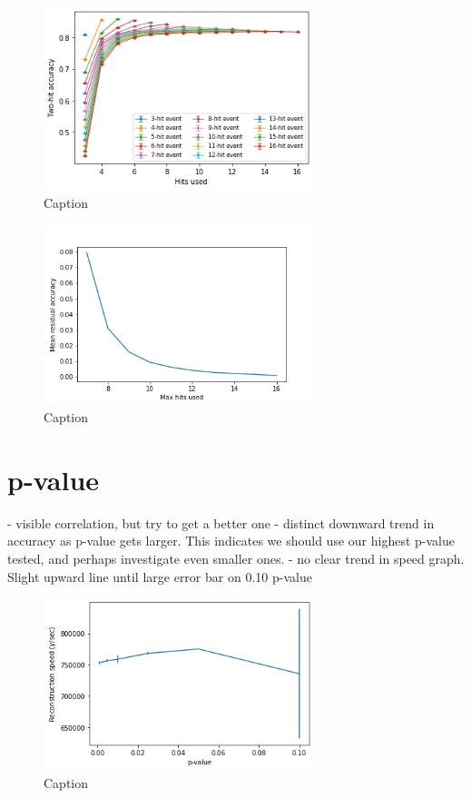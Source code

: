 \begin{figure}
    \centering
    \includegraphics[width=0.7\textwidth]{graphs/pi_hits_v_hitsUsed_accuracy.png}
    \caption{Caption}
    \label{fig:my_label}
\end{figure}

\begin{figure}
    \centering
    \includegraphics[width=0.7\textwidth]{graphs/mean_resid_acc.png}
    \caption{Caption}
    \label{fig:my_label}
\end{figure}

\section{p-value}
- visible correlation, but try to get a better one
- distinct downward trend in accuracy as p-value gets larger. This indicates we should use our highest p-value tested, and perhaps investigate even smaller ones.
- no clear trend in speed graph. Slight upward line until large error bar on 0.10 p-value

\begin{figure}
    \centering
    \includegraphics[width=0.7\textwidth]{graphs/pi_p_speed.png}
    \caption{Caption}
    \label{fig:my_label}
\end{figure}

